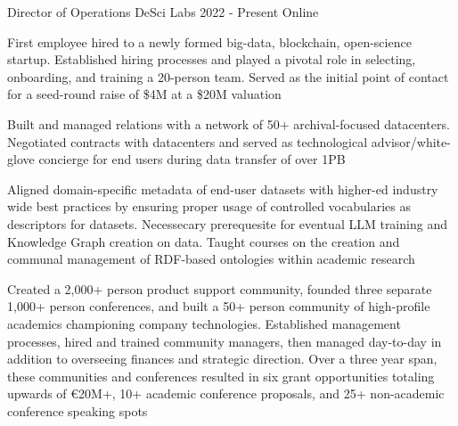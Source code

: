 
\begin{cventries}

  \cventry
    {Director of Operations} %
    {DeSci Labs} %
    {2022 - Present} %
    {Online} %
    {
      \begin{cvitems} %
        \item {First employee hired to a newly formed big-data, blockchain, open-science startup. Established hiring processes and played a pivotal role in selecting, onboarding, and training a 20-person team. Served as the initial point of contact for a seed-round raise of \$4M at a \$20M valuation}
        \item {Built and managed relations with a network of 50+ archival-focused datacenters. Negotiated contracts with datacenters and served as technological advisor/white-glove concierge for end users during data transfer of over 1PB}  
        \item {Aligned domain-specific metadata of end-user datasets with higher-ed industry wide best practices by ensuring proper usage of controlled vocabularies as descriptors for datasets. Necessecary prerequesite for eventual LLM training and Knowledge Graph creation on data. Taught courses on the creation and communal management of RDF-based ontologies within academic research}  
        \item {Created a 2,000+ person product support community, founded three separate 1,000+ person conferences, and built a 50+ person community of high-profile academics championing company technologies. Established management processes, hired and trained community managers, then managed day-to-day in addition to overseeing finances and strategic direction. Over a three year span, these communities and conferences resulted in six grant opportunities totaling upwards of €20M+, 10+ academic conference proposals, and 25+ non-academic conference speaking spots}
      \end{cvitems}
    }


\end{cventries}
